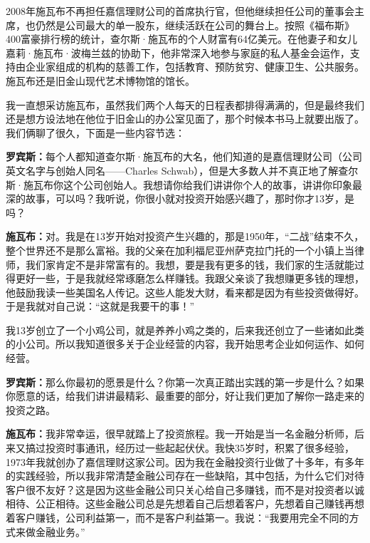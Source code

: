 2008年施瓦布不再担任嘉信理财公司的首席执行官，但他继续担任公司的董事会主席，也仍然是公司最大的单一股东，继续活跃在公司的舞台上。按照《福布斯》400富豪排行榜的统计，查尔斯·施瓦布的个人财富有64亿美元。在他妻子和女儿嘉莉·施瓦布·波梅兰兹的协助下，他非常深入地参与家庭的私人基金会运作，支持由企业家组成的机构的慈善工作，包括教育、预防贫穷、健康卫生、公共服务。施瓦布还是旧金山现代艺术博物馆的馆长。

我一直想采访施瓦布，虽然我们两个人每天的日程表都排得满满的，但是最终我们还是想方设法地在他位于旧金山的办公室见面了，那个时候本书马上就要出版了。我们俩聊了很久，下面是一些内容节选：

\begin{BookQuote}
\textbf{罗宾斯：}每个人都知道查尔斯·施瓦布的大名，他们知道的是嘉信理财公司（公司英文名字与创始人同名——Charles Schwab），但是大多数人并不真正地了解查尔斯·施瓦布你这个公司创始人。我想请你给我们讲讲你个人的故事，讲讲你印象最深的故事，可以吗？我听说，你很小就对投资开始感兴趣了，那时你才13岁，是吗？
\end{BookQuote}

\begin{BookQuote}
\textbf{施瓦布：}对。我是在13岁开始对投资产生兴趣的，那是1950年，“二战”结束不久，整个世界还不是那么富裕。我的父亲在加利福尼亚州萨克拉门托的一个小镇上当律师，我们家肯定不是非常富有的。我想，要是我有更多的钱，我们家的生活就能过得更好一些，于是我就经常琢磨怎么样赚钱。我跟父亲谈了我想赚更多钱的理想，他鼓励我读一些美国名人传记。这些人能发大财，看来都是因为有些投资做得好。于是我就对自己说：“这就是我要干的事！”
\end{BookQuote}

我13岁创立了一个小鸡公司，就是养养小鸡之类的，后来我还创立了一些诸如此类的小公司。所以我知道很多关于企业经营的内容，我开始思考企业如何运作、如何经营。

\begin{BookQuote}
\textbf{罗宾斯：}那么你最初的愿景是什么？你第一次真正踏出实践的第一步是什么？如果你愿意的话，给我们讲讲最精彩、最重要的部分，好让我们更加了解你一路走来的投资之路。
\end{BookQuote}

\begin{BookQuote}
\textbf{施瓦布：}我非常幸运，很早就踏上了投资旅程。我一开始是当一名金融分析师，后来又搞过投资时事通讯，经历过一些起起伏伏。我快35岁时，积累了很多经验，1973年我就创办了嘉信理财这家公司。因为我在金融投资行业做了十多年，有多年的实践经验，所以我非常清楚金融公司存在一些缺陷，其中包括，为什么它们对待客户很不友好？这是因为这些金融公司只关心给自己多赚钱，而不是对投资者以诚相待、公正相待。这些金融公司总是先想着自己后想着客户，先想着自己赚钱再想着客户赚钱，公司利益第一，而不是客户利益第一。我说：“我要用完全不同的方式来做金融业务。”
\end{BookQuote}

